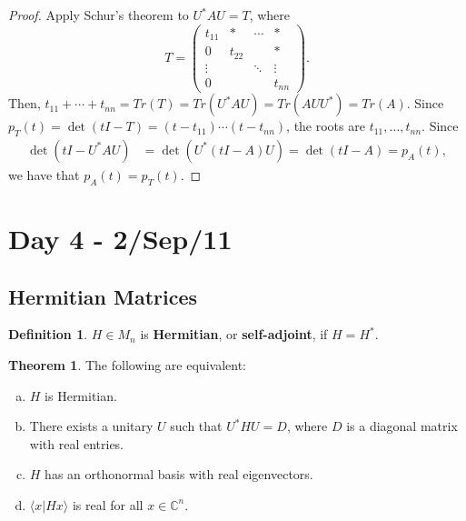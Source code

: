 \documentclass[12pt]{article}
\theoremstyle{definition}
\newtheorem*{theorem}{Theorem}
\newtheorem*{definition}{Definition}
\newcommand{\braket}[2]{\langle #1|#2\rangle}
\newcommand{\C}{\mathbb{C}}
\begin{document}
\begin{proof}
Apply Schur's theorem to $U^*AU = T$, where
\[
T = \left(\begin{array}{cccc}
t_{11} & * & \cdots & * \\
0 & t_{22} & & * \\
\vdots & & \ddots & \vdots \\
0 & & & t_{nn}
\end{array}\right).
\]
Then, $t_{11} + \cdots + t_{nn} = Tr(T) = Tr(U^*AU) = Tr(AUU^*) = Tr(A)$. Since $p_T(t) = \det(tI-T) = (t-t_{11})\cdots(t-t_{nn})$, the roots are $t_{11},\ldots,t_{nn}$. Since
\begin{align*}
\det(tI - U^*AU) &= \det(U^*(tI-A)U) = \det(tI-A) = p_A(t),
\end{align*}
we have that $p_A(t) = p_T(t)$.
\end{proof}

\section{Day 4 - 2/Sep/11}

\subsection{Hermitian Matrices}

\begin{definition}
$H \in M_n$ is \textbf{Hermitian}, or \textbf{self-adjoint}, if $H = H^*$.
\end{definition}

\begin{theorem}
The following are equivalent:
\begin{enumerate}[(a)]
\item $H$ is Hermitian.
\item There exists a unitary $U$ such that $U^*HU = D$, where $D$ is a diagonal matrix with real entries.
\item $H$ has an orthonormal basis with real eigenvectors.
\item $\braket{x}{Hx}$ is real for all $x \in \C^n$.
\end{enumerate}
\end{theorem}
\end{document}
